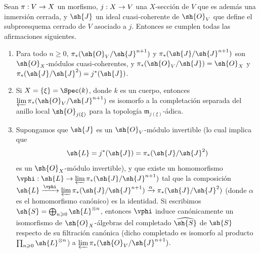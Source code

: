 \documentclass[oneside,10pt]{amsart}
\makeatletter
\renewcommand{\geq}{\geqslant}
\newcommand{\ega@arrow}[2]{\mathchoice{#1}{#2}{#2}{#2}}
\renewcommand{\to}{\ega@arrow{\longrightarrow}{\rightarrow}}
\let\EGAOriginalLabel\label
\renewcommand{\label}[1]{\phantomsection\EGAOriginalLabel{#1}}
\makeatother
\begin{document}
\begin{lemma}[8.10.1]
\label{II.8.10.1}
Sean $\pi:V\to X$ un morfismo, $j:X\to V$ una $X$-sección de $V$ que es además una inmersión cerrada, y $\sh{J}$ un ideal cuasi-coherente de $\sh{O}_V$ que define el subpreesquema cerrado de $V$ asociado a $j$.
Entonces se cumplen todas las afirmaciones siguientes.
\begin{enumerate}
  \item[\rm{(i)}] Para todo $n\geq0$, $\pi_*(\sh{O}_V/\sh{J}^{n+1})$ y $\pi_*(\sh{J}/\sh{J}^{n+1})$ son $\sh{O}_X$-módulos cuasi-coherentes, y $\pi_*(\sh{O}_V/\sh{J})=\sh{O}_X$ y $\pi_*(\sh{J}/\sh{J}^2)=j^*(\sh{J})$.
  \item[\rm{(ii)}] Si $X=\{\xi\}=\Spec(k)$, donde $k$ es un cuerpo, entonces $\varprojlim\pi_*(\sh{O}_V/\sh{J}^{n+1})$ es isomorfo a la completación separada del anillo local $\sh{O}_{j(\xi)}$ para la topología $\mathfrak{m}_{j(\xi)}$-ádica.
  \item[\rm{(iii)}] Supongamos que $\sh{J}$ es un $\sh{O}_V$-módulo invertible (lo cual implica que
    \[
      \sh{L} = j^*(\sh{J}) = \pi_*(\sh{J}/\sh{J}^2)
    \]
    es un $\sh{O}_X$-módulo invertible), y que existe un homomorfismo $\vphi:\sh{L}\to\varprojlim\pi_*(\sh{J}/\sh{J}^{n+1})$ tal que la composición $\sh{L} \xrightarrow{\vphi} \varprojlim\pi_*(\sh{J}/\sh{J}^{n+1}) \xrightarrow{\alpha} \pi_*(\sh{J}/\sh{J}^2)$ (donde $\alpha$ es el homomorfismo canónico) es la identidad.
    Si escribimos $\sh{S}=\bigoplus_{n\geq0}\sh{L}^{\otimes n}$, entonces $\vphi$ induce canónicamente un isomorfismo de $\sh{O}_X$-álgebras del completado $\widehat{\sh{S}}$ de $\sh{S}$ respecto de su filtración canónica (dicho completado es isomorfo al producto $\prod_{n\geq0}\sh{L}^{\otimes n}$) a $\varprojlim\pi_*(\sh{O}_V/\sh{J}^{n+1})$.
\end{enumerate}
\end{lemma}
\end{document}
